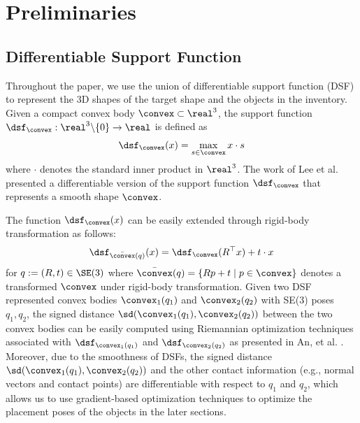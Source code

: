 \section{Preliminaries} \label{sec:preliminaries}

\subsection{Differentiable Support Function}
Throughout the paper, we use the union of differentiable support function (DSF) to represent the 3D shapes of the target shape and the objects in the inventory.
Given a compact convex body $\convex \subset \real^3$, the support function $\dsf_\convex :\real^3 \backslash\{0\} \to \real$ is defined as
\begin{equation*}
    \dsf_\convex(x) = \max_{s \in \convex} x\cdot s
\end{equation*}
where $\cdot$ denotes the standard inner product in $\real^3$.
The work of Lee et al. \cite{lee2023uncertain} presented a differentiable version of the support function $\dsf_\convex$ that represents a smooth shape $\convex$.

The function $\dsf_{\convex}(x)$ can be easily extended through rigid-body transformation as follows:
\begin{equation*}
    \dsf_{\bar{\convex}(q)}(x) = \dsf_\convex(R^\top x) + t \cdot x
\end{equation*}
for $q := (R,t) \in \SE(3)$ where $\bar{\convex}(q)=\{Rp + t\mid p \in \convex\}$ denotes a transformed $\convex$ under rigid-body transformation.
Given two DSF represented convex bodies $\convex_1(q_1)$ and $\convex_2(q_2)$ with SE(3) poses $q_1,q_2$, the signed distance $\sd(\convex_1(q_1), \convex_2(q_2))$ between the two convex bodies can be easily computed using Riemannian optimization techniques associated with $\dsf_{\convex_1(q_1)}$ and $\dsf_{\convex_2(q_2)}$ as presented in An, et al. \cite{an2024riemannianmtd}.
Moreover, due to the smoothness of DSFs, the signed distance $\sd(\convex_1(q_1), \convex_2(q_2))$ and the other contact information (e.g., normal vectors and contact points) are differentiable with respect to $q_1$ and $q_2$, which allows us to use gradient-based optimization techniques to optimize the placement poses of the objects in the later sections.

